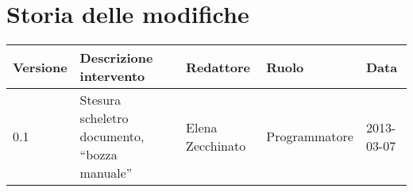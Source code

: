 \newcommand{\docName}{ManualeUtente}
\newcommand{\docFileName}{ManualeUtente.1.0.pdf}
\newcommand{\docVers}{1.0}
\newcommand{\creationDate}{2013-03-07}
\newcommand{\modificationDate}{2013-03-07}
\newcommand{\docState}{Non approvato}
\newcommand{\docUsage}{Esterno}
\newcommand{\docDistributionList}{Prof. Tullio Vardanega\\ & Prof. Riccardo Cardin}
\newcommand{\docAuthors}{Elena Zecchinato}
\newcommand{\approvedBy}{Andrea Rizzi}
\newcommand{\verifiedBy}{---}
\newcommand{\docRoot}{..}
\def\INDICETABELLE{true}
\def\INDICEFIGURE{true}



\usepackage[italian]{varioref}





\section*{Storia delle modifiche}
\begin{longtable}{lp{}lll}
\toprule
Versione & Descrizione intervento & Redattore & Ruolo & Data\\
\midrule %

0.1 & Stesura scheletro documento, ``bozza manuale'' & Elena Zecchinato & Programmatore & 2013-03-07\\
\bottomrule
\end{longtable}
\newpage

